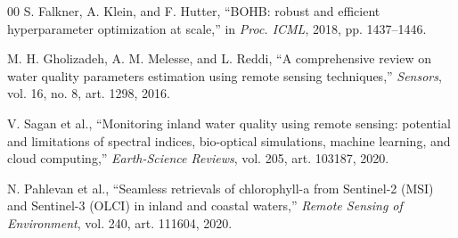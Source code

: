 \documentclass[conference]{IEEEtran}
\begin{document}
\begin{thebibliography}{00}
 S. Falkner, A. Klein, and F. Hutter, ``BOHB: robust and
efficient hyperparameter optimization at scale,'' in \emph{Proc. ICML}, 2018,
pp. 1437--1446.

 M. H. Gholizadeh, A. M. Melesse, and L. Reddi, ``A
comprehensive review on water quality parameters estimation using remote
sensing techniques,'' \emph{Sensors}, vol. 16, no. 8, art. 1298, 2016.

 V. Sagan et al., ``Monitoring inland water quality using
remote sensing: potential and limitations of spectral indices, bio-optical
simulations, machine learning, and cloud computing,'' \emph{Earth-Science
Reviews}, vol. 205, art. 103187, 2020.

 N. Pahlevan et al., ``Seamless retrievals of chlorophyll-a
from Sentinel-2 (MSI) and Sentinel-3 (OLCI) in inland and coastal waters,''
\emph{Remote Sensing of Environment}, vol. 240, art. 111604, 2020.

\end{thebibliography}
\end{document}
